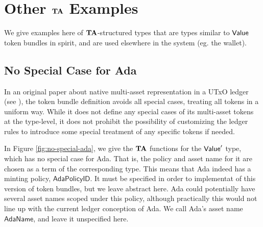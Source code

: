 \section{Other $\mathbf{TA}$ Examples}
\label{sec:other-valmonoids}

We give examples here of $\mathbf{TA}$-structured types
that are types similar to $\mathsf{Value}$ token bundles in spirit, and are used elsewhere
in the system (eg. the wallet).

\subsection{No Special Case for Ada}

In an original paper about native multi-asset representation in a UTxO ledger
(see \cite{utxo_ma}), the token bundle definition avoids all special cases, treating
all tokens in a uniform way.
While it does not define any special cases of its multi-asset tokens at the type-level,
it does not prohibit the possibility of customizing the ledger rules to introduce
some special treatment of any specific tokens if needed.

In Figure \ref{fig:no-special-ada}, we give the $\mathbf{TA}$ functions for
the $\mathsf{Value}'$ type, which has no special case for Ada. That is, the policy and
asset name for it are chosen as a term of the corresponding type. This means
that Ada indeed has a minting policy, $\mathsf{AdaPolicyID}$. It must be specified in
order to implementat of this version of token bundles, but we leave abstract here.
Ada could potentially have several asset names scoped under this policy, although
practically this would not line up with the current ledger conception of Ada.
We call Ada's asset name $\mathsf{AdaName}$, and leave it unspecified here. \\~\\

